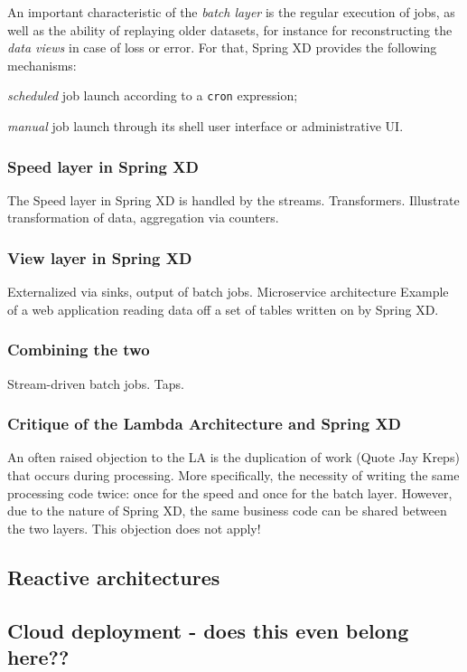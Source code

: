 An important characteristic of the \emph{batch layer} is the regular
execution of jobs, as well as the ability of replaying older datasets, for
instance for reconstructing the \emph{data views} in case of loss or error.
For that, Spring XD provides the following mechanisms:

\begin{itemize*}
\item \emph{scheduled} job launch according to a \texttt{cron} expression;
\item \emph{manual} job launch through its shell user interface or administrative UI.
\end{itemize*}

\subsubsection {Speed layer in Spring XD}

The Speed layer in Spring XD is handled by the streams. Transformers.
Illustrate transformation of data, aggregation via counters.

\subsubsection {View layer in Spring XD}

Externalized via sinks, output of batch jobs. Microservice architecture
Example of a web application reading data off a set of tables
written on by Spring XD. 

\subsubsection {Combining the two}

Stream-driven batch jobs. Taps. 


\subsubsection {Critique of the Lambda Architecture and Spring XD}

An often raised objection to the LA is the duplication of work
(Quote Jay Kreps) that occurs during processing. More specifically,
the necessity of writing the same processing code twice: once for the
speed and once for the batch layer. However, due to the nature of
Spring XD, the same business code can be shared between the two 
layers. This objection does not apply!

\subsection {Reactive architectures}

\subsection {Cloud deployment - does this even belong here??}
